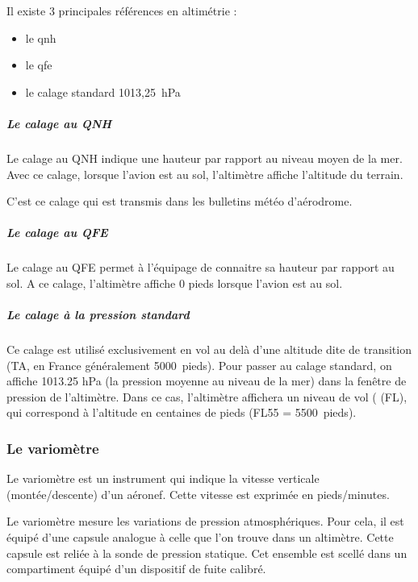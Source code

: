 	Il existe 3 principales références en altimétrie :
	\begin{itemize}
		\item le \acrshort{qnh}
		\item le \acrshort{qfe}
		\item le calage standard 1013,25~hPa
	\end{itemize}
	
	\subparagraph{Le calage au QNH}
	Le calage au QNH indique une hauteur par rapport au niveau moyen de la mer. Avec ce calage, lorsque l'avion est au sol, l'altimètre affiche l'altitude du terrain.
	
	C'est ce calage qui est transmis dans les bulletins météo d'aérodrome.
	
	\subparagraph{Le calage au QFE}
	Le calage au QFE permet à l'équipage de connaitre sa hauteur par rapport au sol. A ce calage, l'altimètre affiche 0 pieds lorsque l'avion est au sol.
	
	
	\subparagraph{Le calage à la pression standard}
	Ce calage est utilisé exclusivement en vol au delà d'une altitude dite de transition (TA, en France généralement 5000~pieds). Pour passer au calage standard, on affiche 1013.25 hPa (la pression moyenne au  niveau de la mer) dans la fenêtre de pression de l'altimètre. Dans ce cas, l'altimètre affichera un niveau de vol ( (FL), qui correspond à l'altitude en centaines de pieds (FL55 = 5500~pieds).
	
	\subsubsection{Le variomètre}
	Le \gls{variomètre}  est un instrument qui indique la vitesse verticale (montée/descente) d'un aéronef. Cette vitesse est exprimée en pieds/minutes.
	
	\begin{figure}[H]	
	\centering
	\end{figure}
	
	Le variomètre mesure les variations de pression atmosphériques. Pour cela, il est équipé d'une capsule analogue à celle que l'on trouve dans un altimètre. Cette capsule est reliée à la sonde de pression statique. Cet ensemble est scellé dans un compartiment équipé d'un dispositif de fuite calibré. 
	
